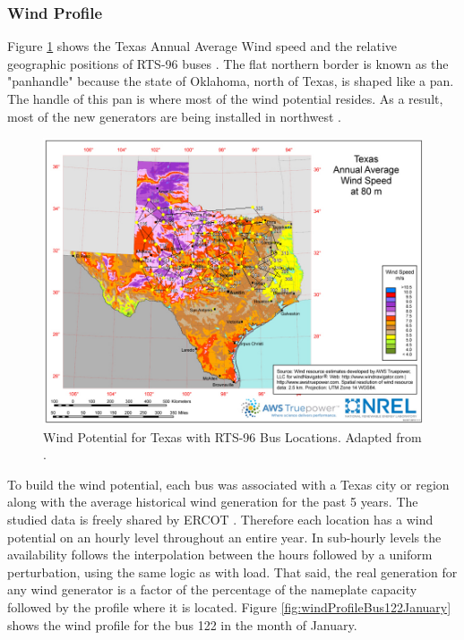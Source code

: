 \documentclass[12pt,LUDisStyle,twosided]{book}
\begin{document}
\newpage
\subsubsection{Wind Profile}


Figure \ref{fig:texasWindProfile} shows the Texas Annual Average Wind speed and the relative geographic positions of RTS-96 buses \cite{wongieee}. The flat northern border is known as the "panhandle" because the state of Oklahoma, north of Texas, is shaped like a pan. The handle of this pan is where most of the wind potential resides. As a result, most of the new generators are being installed in northwest \cite{texasWindProfile}.

\begin{figure}[H] 
  \includegraphics[width=\textwidth,keepaspectratio]{texasWindProfileWithBuses.png}
  \caption{Wind Potential for Texas with RTS-96 Bus Locations. Adapted from \cite{texasWindProfile}. }
  \label{fig:texasWindProfile}
\end{figure}


To build the wind potential, each bus was associated with a Texas city or region along with the average historical wind generation for the past 5 years. The studied data is freely shared by ERCOT \cite{ercotGenerationWind}. Therefore each location has a wind potential on an hourly level throughout an entire year. In sub-hourly levels the availability follows the interpolation between the hours followed by a uniform perturbation, using the same logic as with load. That said, the real generation for any wind generator is a factor of the percentage of the nameplate capacity followed by the profile where it is located. Figure \ref{fig:windProfileBus122January} shows the wind profile for the bus 122 in the month of January.
\end{document}
